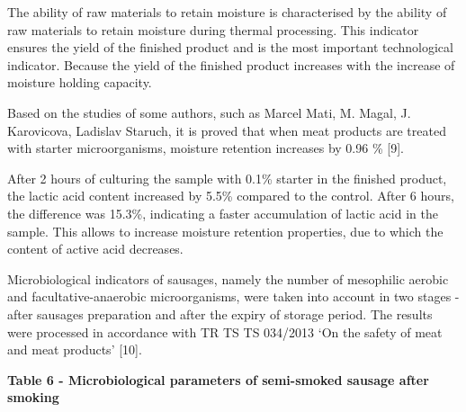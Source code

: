 The ability of raw materials to retain moisture is characterised by the
ability of raw materials to retain moisture during thermal processing.
This indicator ensures the yield of the finished product and is the most
important technological indicator. Because the yield of the finished
product increases with the increase of moisture holding capacity.

Based on the studies of some authors, such as Marcel Mati, M. Magal, J.
Karovicova, Ladislav Staruch, it is proved that when meat products are
treated with starter microorganisms, moisture retention increases by
0.96 \% {[}9{]}.

After 2 hours of culturing the sample with 0.1\% starter in the finished
product, the lactic acid content increased by 5.5\% compared to the
control. After 6 hours, the difference was 15.3\%, indicating a faster
accumulation of lactic acid in the sample. This allows to increase
moisture retention properties, due to which the content of active acid
decreases.

Microbiological indicators of sausages, namely the number of mesophilic
aerobic and facultative-anaerobic microorganisms, were taken into
account in two stages - after sausages preparation and after the expiry
of storage period. The results were processed in accordance with TR TS
TS 034/2013 `On the safety of meat and meat products' {[}10{]}.

{\bfseries Table 6 - Microbiological parameters of semi-smoked sausage
after smoking}


